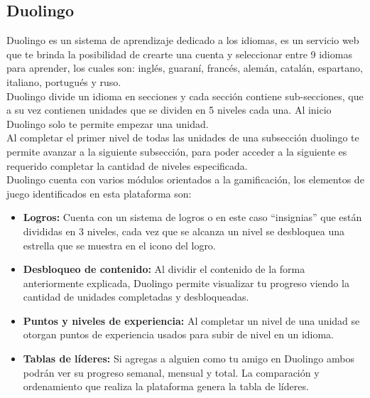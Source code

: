 \begin{multicols*}{2}
\subsection{Duolingo}

 Duolingo \cite{PagDuolingo} es un sistema de aprendizaje dedicado a los idiomas, es un servicio web que
 te brinda la posibilidad de crearte una cuenta y seleccionar entre 9 idiomas para aprender,
 los cuales son: inglés, guaraní, francés, alemán, catalán, espartano, italiano, portugués y ruso.\\

 \noindent Duolingo divide un idioma en secciones y cada sección contiene sub-secciones,
 que a su vez contienen unidades que se dividen en 5 niveles cada una. Al inicio Duolingo
 solo te permite empezar una unidad.\\

 \noindent Al completar el primer nivel de todas las unidades de una subsección
 duolingo te permite avanzar a la siguiente subsección, para poder acceder a la
 siguiente es requerido completar la cantidad de niveles especificada.\\

 \noindent Duolingo cuenta con varios módulos orientados a la gamificación, los elementos
 de juego identificados en esta plataforma son:

    \begin{itemize}
    \item {\bf Logros:} Cuenta con un sistema de logros o en este caso ``insignias''
        que están divididas en 3 niveles, cada vez que se alcanza un nivel se
        desbloquea una estrella que se muestra en el icono del logro.

    \item {\bf Desbloqueo de contenido:} Al dividir el contenido de la forma
        anteriormente explicada, Duolingo permite visualizar tu progreso viendo
        la cantidad de unidades completadas y desbloqueadas.

    \item {\bf Puntos y niveles de experiencia:} Al completar un nivel de una unidad
        se otorgan puntos de experiencia usados para subir de nivel en un idioma.

    \item {\bf Tablas de líderes:} Si agregas a alguien como tu amigo en Duolingo ambos
        podrán ver su progreso semanal, mensual y total. La comparación y ordenamiento
        que realiza la plataforma genera la tabla de líderes.


\end{itemize}
\end{multicols*}
